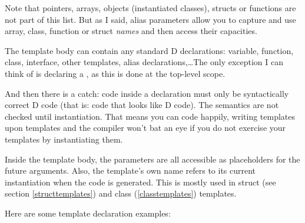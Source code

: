 Note that pointers, arrays, objects (instantiated classes), structs or functions are not part of this list. But as I said, alias parameters allow you to capture and use array, class, function or struct \emph{names} and then access their capacities.

The template body can contain any standard D declarations: variable, function, class, interface, other templates, alias declarations,\ldots The only exception I can think of is declaring a , as this is done at the top-level scope. 

 {And then there is a catch: code inside a  declaration must only be syntactically correct D code (that is: code that looks like D code). The semantics are not checked until instantiation. That means you can code happily, writing templates upon templates and the compiler won't bat an eye if you do not exercise your templates by instantiating them.}

Inside the template body, the parameters are all accessible as placeholders for the future arguments. Also, the template's own name refers to its current instantiation when the code is generated. This is mostly used in struct (see section \ref{structtemplates}) and class (\ref{classtemplates}) templates.

Here are some template declaration examples:\label{templatedeclarationexamples}

